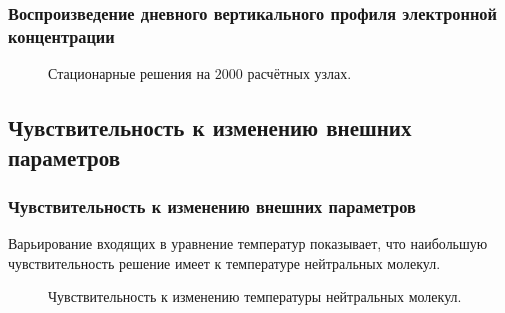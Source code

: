 \documentclass[9pt, apectratio=43,unicode]{beamer}
\begin{document}
\begin{frame}\frametitle{Воспроизведение дневного вертикального профиля электронной концентрации}

\begin{figure}[H]
\caption{Стационарные решения на $2000$ расчётных узлах.}
\end{figure}
\end{frame}


\subsection{Чувствительность к изменению внешних параметров}
\begin{frame}\frametitle{Чувствительность к изменению внешних параметров}

Варьирование входящих в уравнение температур показывает, что наибольшую чувствительность решение имеет к температуре нейтральных молекул.

\begin{figure}
\caption{Чувствительность к изменению температуры нейтральных молекул.}
\end{figure}

\end{frame}
\end{document}
